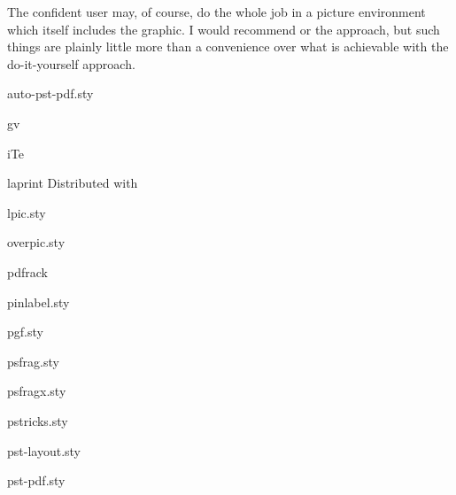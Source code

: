 The confident user may, of course, do the whole job in a picture
environment which itself includes the graphic.  I would recommend
 or the  approach, but such things
are plainly little more than a convenience over what is achievable
with the do-it-yourself approach.
\begin{ctanrefs}
\item[auto-pst-pdf.sty]
\item[gv]
\item[iTe]
\item[laprint]Distributed with 
\item[lpic.sty]
\item[overpic.sty]
\item[pdfrack]
\item[pinlabel.sty]
\item[pgf.sty]
\item[psfrag.sty]
\item[psfragx.sty]
\item[pstricks.sty]
\item[pst-layout.sty]
\item[pst-pdf.sty]
\end{ctanrefs}
